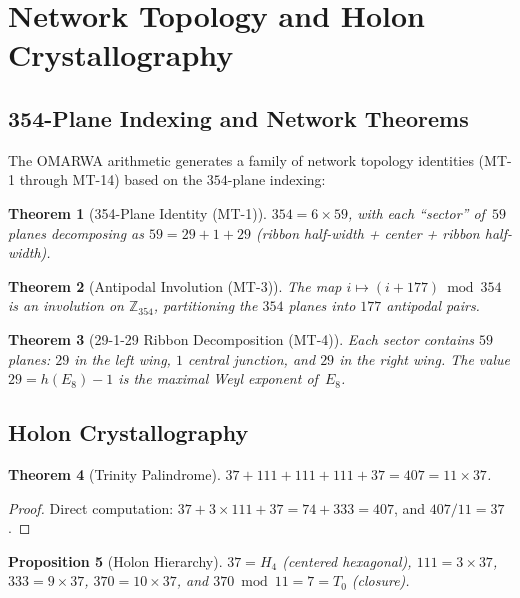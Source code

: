 \documentclass[11pt, a4paper]{article}
\theoremstyle{plain}
\newtheorem{theorem}{Theorem}[section]
\newtheorem{proposition}[theorem]{Proposition}
\theoremstyle{definition}
\theoremstyle{remark}
\begin{document}
\section{Network Topology and Holon
  Crystallography}\label{sec:holon}

\subsection{354-Plane Indexing and Network Theorems}

The OMARWA arithmetic generates a family of network topology identities
(MT-1 through MT-14) based on the $354$-plane indexing:

\begin{theorem}[354-Plane Identity (MT-1)]\label{thm:mt1}
$354 = 6 \times 59$, with each ``sector'' of~$59$ planes decomposing as
$59 = 29 + 1 + 29$ (ribbon half-width + center + ribbon half-width).
\end{theorem}

\begin{theorem}[Antipodal Involution (MT-3)]\label{thm:mt3}
The map $i \mapsto (i + 177) \bmod 354$ is an involution on
$\mathbb{Z}_{354}$, partitioning the $354$ planes into $177$ antipodal
pairs.
\end{theorem}

\begin{theorem}[29-1-29 Ribbon Decomposition (MT-4)]\label{thm:mt4}
Each sector contains $59$ planes: $29$ in the left wing, $1$ central
junction, and $29$ in the right wing. The value $29 = h(E_8) - 1$
is the maximal Weyl exponent of~$E_8$.
\end{theorem}

\subsection{Holon Crystallography}

\begin{theorem}[Trinity Palindrome]\label{thm:trinity}
$37 + 111 + 111 + 111 + 37 = 407 = 11 \times 37$.
\end{theorem}

\begin{proof}
Direct computation: $37 + 3 \times 111 + 37 = 74 + 333 = 407$, and
$407 / 11 = 37$.
\end{proof}

\begin{proposition}[Holon Hierarchy]\label{prop:holon-hier}
$37 = H_4$ (centered hexagonal), $111 = 3 \times 37$,
$333 = 9 \times 37$, $370 = 10 \times 37$, and $370 \bmod 11 = 7 = T_0$
(closure).
\end{proposition}
\end{document}
